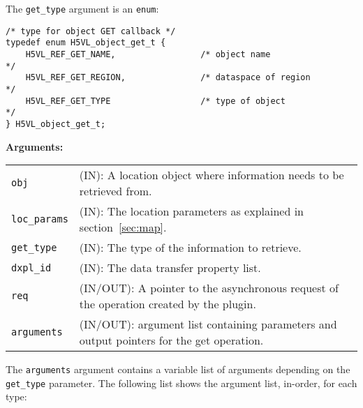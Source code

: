 The {\tt get\_type} argument is an {\tt enum}:
\begin{lstlisting}
/* type for object GET callback */
typedef enum H5VL_object_get_t {
    H5VL_REF_GET_NAME,                 /* object name                       */
    H5VL_REF_GET_REGION,               /* dataspace of region               */
    H5VL_REF_GET_TYPE                  /* type of object                    */
} H5VL_object_get_t;
\end{lstlisting}

\textbf{Arguments:}\\
\begin{tabular}{l p{10cm}}
  {\tt obj} & (IN): A location object where information needs to be
  retrieved from.\\
  {\tt loc\_params} & (IN): The location parameters as
  explained in section~\ref{sec:map}.\\
  {\tt get\_type} & (IN): The type of the information to retrieve.\\
  {\tt dxpl\_id} & (IN): The data transfer property list.\\
  {\tt req} & (IN/OUT): A pointer to the asynchronous request of the
  operation created by the plugin.\\
  {\tt arguments} & (IN/OUT): argument list containing parameters and
  output pointers for the get operation. \\
\end{tabular}

The {\tt arguments} argument contains a variable list of arguments
depending on the {\tt get\_type} parameter. The following list shows
the argument list, in-order, for each type:

